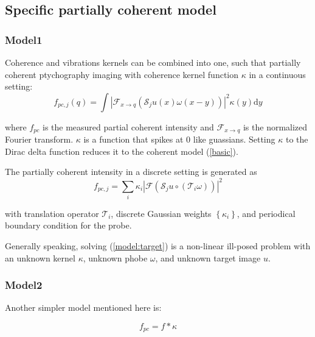 \documentclass{article}
\numberwithin{equation}{section}
\begin{document}
\subsection{Specific partially coherent model}
 \label{section:specific models}

\subsubsection{Model1\cite{chang}}
Coherence and vibrations kernels can be combined into one, such that partially coherent ptychography imaging with coherence kernel function $\kappa$ in a continuous setting:
\begin{equation}
f_{p c, j}(q) = \int\left|\mathcal{F}_{x \rightarrow q}\left(\mathcal{S}_{j} u(x) \omega(x-y)\right)\right|^{2} \kappa(y) \mathrm{d} y
\end{equation}

where $f_{p c}$ is the measured partial coherent intensity and $\mathcal{F}_{x \rightarrow q}$ is the normalized Fourier transform. $\kappa$ is a function that spikes at 0 like guassians. Setting $\kappa$ to the Dirac delta function reduces it to the coherent model (\ref{basic}).

The partially coherent intensity in a discrete setting is generated as
\begin{equation}
f_{p c, j}=\sum_{i} \kappa_{i}\left|\mathcal{F}\left( \mathcal{S}_{j} u \circ \left(\mathcal{T}_{i} \omega\right) \right)\right|^{2}
\label{model:target}
\end{equation}


with translation operator $\mathcal{T}_{i}$, discrete Gaussian weights $\left\{\kappa_{i}\right\}$, and periodical boundary condition for the probe.

Generally speaking, solving (\ref{model:target}) is a non-linear
ill-posed problem with an unknown kernel $\kappa$, unknown phobe $\omega$, and unknown target image $u$. 



\subsubsection{Model2\cite{psf}}
Another simpler model mentioned here is:

\begin{equation}
\label{model: simple}
    f_{p c}=f * \kappa
\end{equation}
\end{document}

